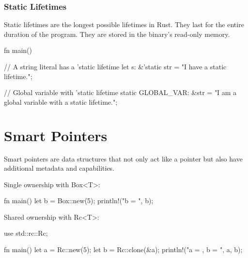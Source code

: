 \documentclass[8pt,a4paper,twocolumn]{extarticle}
\begin{document}

\subsubsection{Static Lifetimes}

Static lifetimes are the longest possible lifetimes in Rust. They last for the entire duration of the program. They are stored in the binary's read-only memory.

\begin{Code}
    fn main() {

        // A string literal has a 'static lifetime
        let s: &'static str = "I have a static lifetime.";


        // Global variable with 'static lifetime
        static GLOBAL_VAR: &str = "I am a global variable with a static lifetime.";

    }
\end{Code}

\section{Smart Pointers}
Smart pointers are data structures that not only act like a pointer but also have additional metadata and capabilities.

Single ownership with Box<T>:
\begin{Code}
    fn main() {
        let b = Box::new(5);
        println!("b = {}", b);
    }
\end{Code}

Shared ownership with Rc<T>:
\begin{Code}
    use std::rc::Rc;

    fn main() {
        let a = Rc::new(5);
        let b = Rc::clone(&a);
        println!("a = {}, b = {}", a, b);
    }
\end{Code}
\end{document}
